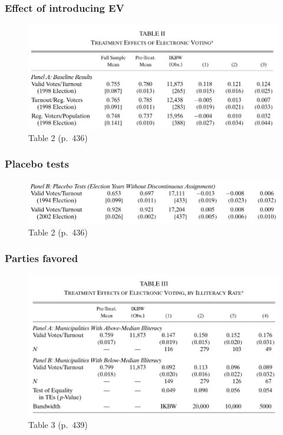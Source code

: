 \documentclass[12pt,english,dvipsnames,aspectratio=169,handout]{beamer}\usepackage[]{graphicx}\usepackage[]{xcolor}
\begin{document}
\begin{frame}
\frametitle{Effect of introducing EV}

\begin{figure}
\centering
\includegraphics[scale=0.4]{../04-figures/07/20-1.PNG}
\caption{Table 2 (p.~436)}
\end{figure}

\end{frame}


\begin{frame}
\frametitle{Placebo tests}

\begin{figure}
\centering
\includegraphics[scale=0.4]{../04-figures/07/20-2.PNG}
\caption{Table 2 (p.~436)}
\end{figure}

\end{frame}


\begin{frame}
\frametitle{Parties favored}

\begin{figure}
\centering
\includegraphics[scale=0.4]{../04-figures/07/22.PNG}
\caption{Table 3 (p.~439)}
\end{figure}

\end{frame}
\end{document}
